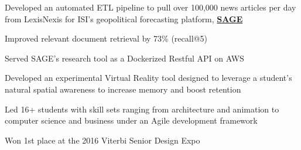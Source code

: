 \documentclass[letterpaper]{deedy-resume} %
\begin{document}
\begin{minipage}[t]{0.66\textwidth}
\begin{tightitemize}
\item Developed an automated ETL pipeline to pull over 100,000 news articles per day from LexisNexis for ISI’s geopolitical forecasting platform, \href{https://sage-platform.isi.edu}{\bf SAGE}
\item Improved relevant document retrieval by 73\% (recall@5) 
\item Served SAGE’s research tool as a Dockerized Restful API on AWS  
\end{tightitemize}



\sectionspace %




\vspace{\topsep} %

\begin{tightitemize}
\item Developed an experimental Virtual Reality tool designed to leverage a student’s natural spatial awareness to increase memory and boost retention
\item Led 16+ students with skill sets ranging from architecture and animation to computer science and business under an Agile development framework
\item Won 1st place at the 2016 Viterbi Senior Design Expo 
\end{tightitemize}

\sectionspace



\vspace{\topsep} %


\end{minipage}
\end{document}
